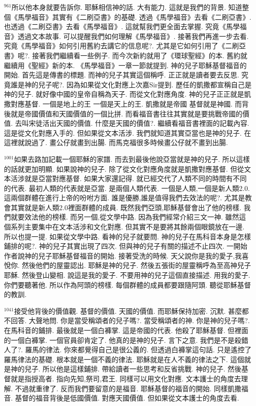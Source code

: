 \documentclass{book}
\begin{document}
$^{961}$所以他本身就要告訴你.
耶穌相信神的話.
大有能力.
這就是我們的背景.
知道整個《馬學福音》其實有《二刷亞書》的基礎.
透過《馬學福音》去看《二刷亞書》.
也透過《二刷亞書》去看《馬學福音》.
這就幫我們更全面去掌握.
究竟《馬學福音》透過文本故事.
可以提醒我們如何理解《馬學福音》.
接著我們再進一步去看.
究竟《馬學福音》如何引用舊約去講它的信息呢?.
尤其是它如何引用了《二刷亞書》呢?.
接著我們繼續看一些例子.
而今次新約就用了《環球聖經》的本.
舊約就繼續用《聖經》新的本.
《馬學福音》一章一節就提到.
神的兒子耶穌基督福音的開始.
首先這是傳書的標題.
而神的兒子其實這個稱呼.
正正就是讀者要去反思.
究竟誰是神的兒子呢?.
因為如果從文化對應上次嘉Sir提到.
歷任的凱撒都宣稱自己是神的兒子.
就好像中國的皇帝自稱為天子.
而從文化對應角度.
神的兒子正正就是凱撒對應基督.
一個是地上的王 一個是天上的王.
凱撒就是帝國 基督就是神國.
而背後就是帝國價值和天國價值的一個比拼.
而看福音書往往其實就是要挑戰帝國的價值.
去叫宋徒活出天國的價值.
什麼是天國的價值?.
繼續看福音書裡面的記載內容.
這是從文化對應入手的.
但如果從文本活涉.
我們就知道其實亞當也是神的兒子.
在這裡就說過了.
畫公仔就畫到出腸.
而馬克福很多時候畫公仔就不畫到出腸.

$^{1001}$如果去路加記載一個耶穌的家譜.
而去到最後他說亞當就是神的兒子.
所以這樣的話就更加明顯.
如果說神的兒子.
除了從文化對應角度就是凱撒對應基督.
但從文本活涉就是亞當對應基督.
如果大家還記得.
就已經交代了人類不同的時間有不同的代表.
最初人類的代表就是亞當.
是兩個人類代表.
一個是人類,一個是新人類2.0.
這兩個群體在進行上帝的吩咐方面.
誰是優勝,誰是值得我們去效法的呢?.
尤其是教會其實就是新人類2.0裡面群體的成員.
既然我們亞頭,耶穌基督會出了他的榜樣.
我們就要效法他的榜樣.
而另一個,從文學中路.
因為我們經常介紹三文一神.
雖然這個系列主要集中在文本活涉和文化對應.
但其實不是要將其餘兩個眼鏡放在一邊.
所以也提一提.
如果從文學中路.
看神的兒子就要問.
神的兒子在馬科音本身是怎樣鋪排的呢?.
神的兒子其實出現了四次.
但與神的兒子有關的描述不止四次.
一開始作者說神的兒子耶穌基督福音的開始.
接著受洗的時候.
天父說你是我的愛子,我喜悅你.
然後他們的屋靈認出.
耶穌是神的兒子.
然後五張街的屋靈稱呼為至高神兒子耶穌.
然後登山變相.
說這是我的愛子.
不要用神的兒子這個直接描述.
用我的愛子.
你們要聽著他.
所以作為阿頭的榜樣.
每個群體的成員都要跟隨阿頭.
聽從耶穌基督的教訓.

$^{1041}$接受他背後的價值觀.
基督的價值.
天國的價值.
而耶穌保持加密.
沉默.
甚麼都不回答.
大聲地問.
你是當受稱頌者的兒子嗎?.
當受稱頌者的神.
你是神的兒子嗎?.
在馬科音的鋪排.
最後就是一個白褲掌.
這是帝國的代表.
他殺了耶穌基督.
但裡面的一個白褲掌.
一個官員卻肯定了.
他真的是神的兒子.
言下之意.
我們是不是殺錯人了?.
羅馬的律法.
你來都覺得自己是很公義的.
但透過白褲掌這句話.
只是遙控了羅馬律法的基礎.
根本就是一個不義的律法.
耶穌就是在人不義的律法之下.
這個就是神的兒子.
所以他是這樣鋪排.
帶給讀者一些思考和反省挑戰.
神的兒子.
然後基督就是指授高者.
指向先知,祭司,君王.
同樣可以用文化對應.
文本護士的角度去理解.
不過就重律了.
反而我們要留意的是福音.
耶穌基督的福音的開始.
同樣凱撒福音.
基督的福音背後是低國價值.
對應天國價值.
但如果從文本護士的角度去看.
\end{document}

